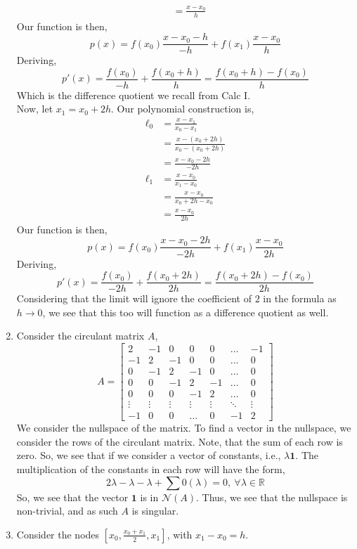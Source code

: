 \documentclass[letterpaper,10pt]{article}
\newcommand{\R}{\mathbb{R}}
\begin{document}
\begin{enumerate}
\begin{align*}
&=\frac{x-x_0}{h}
\end{align*}
Our function is then,
\[p(x)=f(x_0)\frac{x-x_0-h}{-h}+f(x_1)\frac{x-x_0}{h}\]
Deriving,
\[p'(x)=\frac{f(x_0)}{-h}+\frac{f(x_0+h)}{h}=\frac{f(x_0+h)-f(x_0)}{h}\]
Which is the difference quotient we recall from Calc I.\\
Now, let $x_1=x_0+2h$. Our polynomial construction is,
\begin{align*}
\ell_0 &= \frac{x-x_1}{x_0-x_1}\\
&= \frac{x-(x_0+2h)}{x_0-(x_0+2h)}\\
&= \frac{x-x_0-2h}{-2h}\\
\ell_1 &= \frac{x-x_0}{x_1-x_0}\\
&=\frac{x-x_0}{x_0+2h-x_0}\\
&=\frac{x-x_0}{2h}
\end{align*}
Our function is then,
\[p(x)=f(x_0)\frac{x-x_0-2h}{-2h}+f(x_1)\frac{x-x_0}{2h}\]
Deriving,
\[p'(x)=\frac{f(x_0)}{-2h}+\frac{f(x_0+2h)}{2h}=\frac{f(x_0+2h)-f(x_0)}{2h}\]
Considering that the limit will ignore the coefficient of $2$ in the formula as $h\to 0$, we see that this too will function as a difference quotient as well.
\item Consider the circulant matrix $A$,
\[A=\begin{bmatrix}
2 & -1 & 0 & 0 & 0 & \ldots & -1\\
-1 & 2 & -1 & 0 & 0 & \ldots & 0\\
0 & -1 & 2 & -1 & 0 & \ldots & 0\\
0 & 0 & -1 & 2 & -1 & \ldots & 0\\
0 & 0 & 0 & -1 & 2 & \ldots & 0\\
\vdots & \vdots & \vdots & \vdots & \vdots & \ddots & \vdots\\
-1 & 0 & 0 & \ldots & 0 & -1 & 2
\end{bmatrix} \]
We consider the nullspace of the matrix. To find a vector in the nullspace, we consider the rows of the circulant matrix. Note, that the sum of each row is zero. So, we see that if we consider a vector of constants, i.e., $\lambda \textbf{1}$. The multiplication of the constants in each row will have the form,
\[2\lambda-\lambda-\lambda + \sum 0(\lambda)=0,\ \forall \lambda \in \R\]
So, we see that the vector $\textbf{1}$ is in $\mathcal{N}(A)$. Thus, we see that the nullspace is non-trivial, and as such $A$ is singular.
\item Consider the nodes $[x_0,\frac{x_0+x_1}{2},x_1]$, with $x_1-x_0=h$.
\begin{enumerate}

\end{enumerate}
\end{enumerate}
\end{document}
